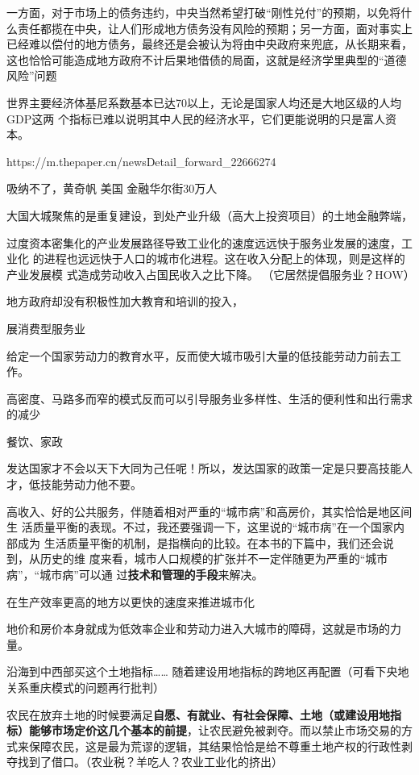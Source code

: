 一方面，对于市场上的债务违约，中央当然希望打破“刚性兑付”的预期，以免将什么责任都揽在中央，让人们形成地方债务没有风险的预期；另一方面，面对事实上已经难以偿付的地方债务，最终还是会被认为将由中央政府来兜底，从长期来看，这也恰恰可能造成地方政府不计后果地借债的局面，这就是经济学里典型的“道德风险”问题


世界主要经济体基尼系数基本已达70以上，无论是国家人均还是大地区级的人均GDP这两
个指标已难以说明其中人民的经济水平，它们更能说明的只是富人资本。

https://m.thepaper.cn/newsDetail_forward_22666274

吸纳不了，黄奇帆 美国 金融华尔街30万人

大国大城聚焦的是重复建设，到处产业升级（高大上投资项目）的土地金融弊端，

过度资本密集化的产业发展路径导致工业化的速度远远快于服务业发展的速度，工业化
的进程也远远快于人口的城市化进程。这在收入分配上的体现，则是这样的产业发展模
式造成劳动收入占国民收入之比下降。 （它居然提倡服务业？HOW）

地方政府却没有积极性加大教育和培训的投入，

展消费型服务业

给定一个国家劳动力的教育水平，反而使大城市吸引大量的低技能劳动力前去工作。

高密度、马路多而窄的模式反而可以引导服务业多样性、生活的便利性和出行需求的减少

餐饮、家政

发达国家才不会以天下大同为己任呢！所以，发达国家的政策一定是只要高技能人才，低技能劳动力他不要。

高收入、好的公共服务，伴随着相对严重的“城市病”和高房价，其实恰恰是地区间生
活质量平衡的表现。不过，我还要强调一下，这里说的“城市病”在一个国家内部成为
生活质量平衡的机制，是指横向的比较。在本书的下篇中，我们还会说到，从历史的维
度来看，城市人口规模的扩张并不一定伴随更为严重的“城市病”，“城市病”可以通
过{\bf 技术和管理的手段}来解决。

在生产效率更高的地方以更快的速度来推进城市化

地价和房价本身就成为低效率企业和劳动力进入大城市的障碍，这就是市场的力量。

沿海到中西部买这个土地指标…… 随着建设用地指标的跨地区再配置（可看下央地关系重庆模式的问题再行批判）

农民在放弃土地的时候要满足{\bf 自愿、有就业、有社会保障、土地（或建设用地指标）能够市场定价这几个基本的前提}，让农民避免被剥夺。而以禁止市场交易的方式来保障农民，这是最为荒谬的逻辑，其结果恰恰是给不尊重土地产权的行政性剥夺找到了借口。（农业税？羊吃人？农业工业化的挤出）

